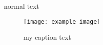 \documentclass[twocolumn]{article}
\begin{document}
normal text

\begin{figure*}[b]
\centering
\texttt{[image: example-image]}
\caption{my caption text}
\end{figure*}
\end{document}
